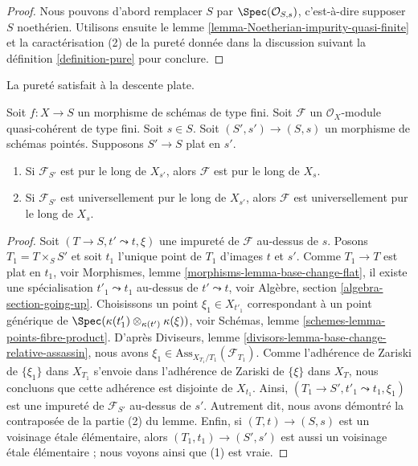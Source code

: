 \begin{proof}
Nous pouvons d'abord remplacer $S$ par $\Spec(\mathcal{O}_{S, s})$, c'est-à-dire
supposer $S$ noethérien. Utilisons ensuite le
lemme \ref{lemma-Noetherian-impurity-quasi-finite}
et la caractérisation (2) de la pureté donnée dans la discussion suivant la
définition \ref{definition-pure}
pour conclure.
\end{proof}

\noindent
La pureté satisfait à la descente plate.

\begin{lemma}
\label{lemma-flat-descend-pure}
Soit $f : X \to S$ un morphisme de schémas de type fini.
Soit $\mathcal{F}$ un $\mathcal{O}_X$-module quasi-cohérent de type fini.
Soit $s \in S$. Soit $(S', s') \to (S, s)$ un morphisme de schémas pointés.
Supposons $S' \to S$ plat en $s'$.
\begin{enumerate}
\item Si $\mathcal{F}_{S'}$ est pur le long de $X_{s'}$,
alors $\mathcal{F}$ est pur le long de $X_s$.
\item Si $\mathcal{F}_{S'}$ est universellement pur le long de $X_{s'}$,
alors $\mathcal{F}$ est universellement pur le long de $X_s$.
\end{enumerate}
\end{lemma}

\begin{proof}
Soit $(T \to S, t' \leadsto t, \xi)$ une impureté de
$\mathcal{F}$ au-dessus de $s$. Posons $T_1 = T \times_S S'$ et soit $t_1$
l'unique point de $T_1$ d'images $t$ et $s'$. Comme
$T_1 \to T$ est plat en $t_1$, voir
Morphismes, lemme \ref{morphisms-lemma-base-change-flat},
il existe une spécialisation $t'_1 \leadsto t_1$ au-dessus de
$t' \leadsto t$, voir
Algèbre, section \ref{algebra-section-going-up}.
Choisissons un point $\xi_1 \in X_{t'_1}$ correspondant à un point
générique de $\Spec(\kappa(t'_1) \otimes_{\kappa(t')} \kappa(\xi))$, voir
Schémas, lemme \ref{schemes-lemma-points-fibre-product}.
D'après
Diviseurs, lemme \ref{divisors-lemma-base-change-relative-assassin},
nous avons $\xi_1 \in \text{Ass}_{X_{T_1}/T_1}(\mathcal{F}_{T_1})$.
Comme l'adhérence de Zariski de $\{\xi_1\}$ dans $X_{T_1}$ s'envoie dans
l'adhérence de Zariski de $\{\xi\}$ dans $X_T$, nous concluons que
cette adhérence est disjointe de $X_{t_1}$. Ainsi,
$(T_1 \to S', t'_1 \leadsto t_1, \xi_1)$
est une impureté de $\mathcal{F}_{S'}$ au-dessus de $s'$.
Autrement dit, nous avons démontré la contraposée de la partie (2) du
lemme. Enfin, si $(T, t) \to (S, s)$ est un voisinage
\'etale élémentaire, alors $(T_1, t_1) \to (S', s')$ est aussi un
voisinage \'etale élémentaire ; nous voyons ainsi que (1) est vraie.
\end{proof}

